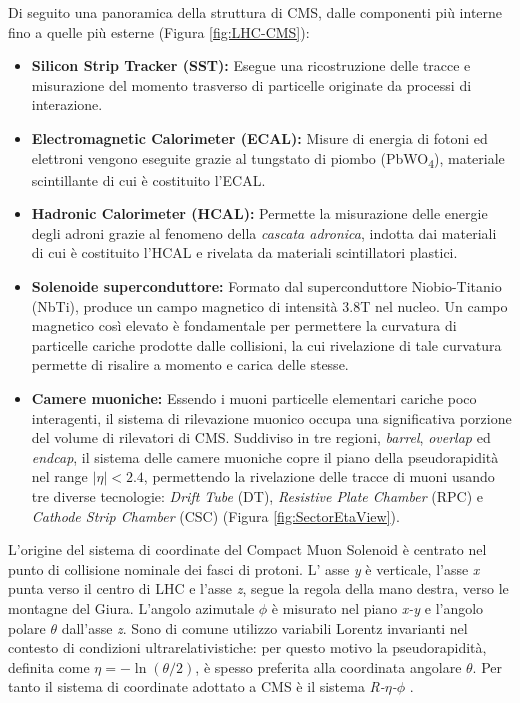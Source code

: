 Di seguito una panoramica della struttura di CMS, dalle componenti più interne fino a quelle più esterne \cite{MasterThesisNicLai}(Figura \ref{fig:LHC-CMS}):

\begin{itemize}
  \item \textbf{Silicon Strip Tracker (SST):} Esegue una ricostruzione delle tracce e misurazione del momento trasverso di particelle originate da processi di interazione. 
  \item \textbf{Electromagnetic Calorimeter (ECAL):} Misure di energia di fotoni ed elettroni vengono eseguite grazie al tungstato di piombo (\si{PbWO_4}), materiale scintillante di cui è costituito l'ECAL.
  \item \textbf{Hadronic Calorimeter (HCAL):} Permette la misurazione delle energie degli adroni grazie al fenomeno della \textit{cascata adronica}, indotta dai materiali di cui è costituito l'HCAL e rivelata da materiali scintillatori plastici.
  \item \textbf{Solenoide superconduttore:} Formato dal superconduttore Niobio-Titanio (NbTi), produce un campo magnetico di intensità 3.8T nel nucleo. Un campo magnetico così elevato è fondamentale per permettere la curvatura di particelle cariche prodotte dalle collisioni, la cui rivelazione di tale curvatura permette di risalire a momento e carica delle stesse.
  \item \textbf{Camere muoniche:} Essendo i muoni particelle elementari cariche poco interagenti, il sistema di rilevazione muonico occupa una significativa porzione del volume di rilevatori di CMS. Suddiviso in tre regioni, \textit{barrel}, \textit{overlap} ed \textit{endcap}, il sistema delle camere muoniche copre il piano della pseudorapidità nel range $|\eta| < 2.4$, permettendo la rivelazione delle tracce di muoni usando tre diverse tecnologie: \textit{Drift Tube} (DT), \textit{Resistive Plate Chamber} (RPC) e \textit{Cathode Strip Chamber} (CSC) \cite{TheMuonProject} (Figura \ref{fig:SectorEtaView}).
\end{itemize}

L'origine del sistema di coordinate del Compact Muon Solenoid è centrato nel punto di collisione nominale dei fasci di protoni. L' asse \textit{y} è verticale, l'asse \textit{x} punta verso il centro di LHC e l'asse \textit{z}, segue la regola della mano destra, verso le montagne del Giura. L'angolo azimutale $\phi$ è misurato nel piano \textit{x-y} e l'angolo polare $\theta$ dall'asse \textit{z}. Sono di comune utilizzo variabili Lorentz invarianti nel contesto di condizioni ultrarelativistiche: per questo motivo la pseudorapidità, definita come $\eta = -\ln\left(\theta/2\right)$, è spesso preferita alla coordinata angolare $\theta$. Per tanto il sistema di coordinate adottato a CMS è il sistema \textit{R-$\eta$-$\phi$} \cite{Quertenmont:2010ota}.



